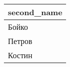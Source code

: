 \begin{tabular}{l}
\toprule
second_name \\
\midrule
Бойко \\
Петров \\
Костин \\
\bottomrule
\end{tabular}
